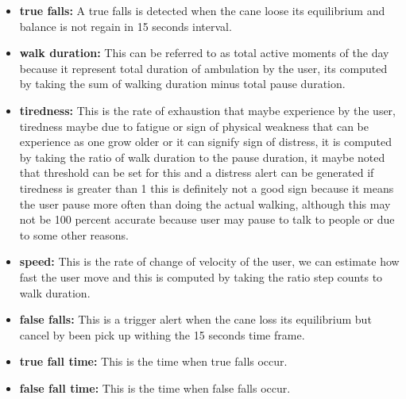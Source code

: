 \documentclass[a4paper, parskip=full]{scrartcl}
\begin{document}
\begin{itemize}
	\item \textbf{true falls:} A true falls is detected when the cane loose its equilibrium and balance is not regain in 15 seconds interval.
	
	\item \textbf{walk duration:} This can be referred to as total active moments of the day because it represent total duration of ambulation by the user, its computed by taking the sum of walking duration minus total pause duration.
	
	\item \textbf{tiredness:} This is the rate of exhaustion that maybe experience by the user, tiredness maybe due to fatigue or sign of physical weakness that can be experience as one grow older or it can signify sign of distress, it is computed by taking the ratio of walk duration to the pause duration, it maybe noted that threshold can be set for this and a distress alert can be generated if tiredness is greater than 1 this is definitely not a good sign because it means the user pause more often than doing the actual walking, although this may not be 100 percent accurate because user may pause to talk to people or due to some other reasons.
	
	\item \textbf{speed:} This is the rate of change of velocity of the user, we can estimate how fast the user move and this is computed by taking the ratio step counts to walk duration.
	
	\item \textbf{false falls:} This is a trigger alert when the cane loss its equilibrium but cancel by been pick up withing the 15 seconds time frame.
	
	\item \textbf{true fall time:} This is the time when true falls occur.
	
	\item \textbf{false fall time:} This is the time when false falls occur.
	
\end{itemize}
\newpage
\end{document}
